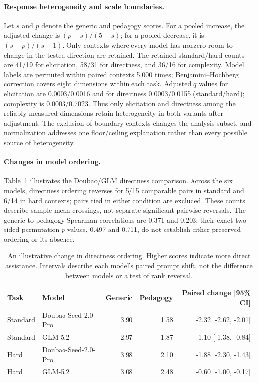 \paragraph{Response heterogeneity and scale boundaries.}
Let $s$ and $p$ denote the generic and pedagogy scores. For a pooled increase,
the adjusted change is $(p-s)/(5-s)$; for a pooled decrease, it is
$(s-p)/(s-1)$. Only contexts
where every model has nonzero room to change in the tested direction are retained. The retained
standard/hard counts are 41/19 for elicitation, 58/31 for directness, and 36/16
for complexity. Model labels are permuted within paired contexts 5,000 times;
Benjamini--Hochberg correction covers eight dimensions within each task.
Adjusted $q$ values for elicitation are 0.0003/0.0016 and for directness
0.0003/0.0155 (standard/hard); complexity is 0.0003/0.7023. Thus only
elicitation and directness among the reliably measured dimensions retain
heterogeneity in both variants after adjustment. The exclusion of boundary
contexts changes the analysis subset, and normalization addresses one
floor/ceiling explanation rather than every possible source of heterogeneity.

\paragraph{Changes in model ordering.}
Table~\ref{tab:prompt-order-example} illustrates the Doubao/GLM directness
comparison. Across the six models, directness ordering reverses for 5/15
comparable pairs in standard and 6/14 in hard contexts; pairs tied in either
condition are excluded. These counts describe sample-mean crossings, not separate
significant pairwise reversals. The generic-to-pedagogy Spearman correlations
are 0.371 and 0.203; their exact two-sided permutation $p$ values, 0.497 and
0.711, do not establish either preserved ordering or its absence.

\begin{table}[t]
\centering\small
\begin{tabular}{llrrr}
\toprule
Task & Model & Generic & Pedagogy & Paired change [95\% CI]\\
\midrule
Standard & Doubao-Seed-2.0-Pro & 3.90 & 1.58 & -2.32 [-2.62, -2.01]\\
Standard & GLM-5.2 & 2.97 & 1.87 & -1.10 [-1.38, -0.84]\\
Hard & Doubao-Seed-2.0-Pro & 3.98 & 2.10 & -1.88 [-2.30, -1.43]\\
Hard & GLM-5.2 & 3.08 & 2.48 & -0.60 [-1.00, -0.17]\\
\bottomrule
\end{tabular}
\caption{An illustrative change in directness ordering. Higher scores indicate more direct assistance. Intervals describe each model's paired prompt shift, not the difference between models or a test of rank reversal.}
\label{tab:prompt-order-example}
\end{table}

